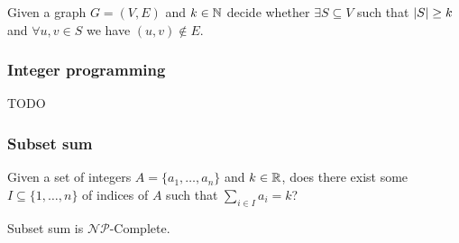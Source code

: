 \documentclass[12pt]{extarticle}
\newcommand{\NP}{{\mathcal{NP}}}
\newcommand{\NPC}{$\NP$-Complete}
\begin{document}
\begin{definition}
    Given a graph $G=(V,E)$ and $k \in \mathbb{N}$ decide whether $\exists S \subseteq V$ such that $\abs{S} \geq k$ and $\forall u, v \in S$ we have $(u, v) \notin E$.
\end{definition}

\subsubsection{Integer programming}
TODO

\subsubsection{Subset sum}
\label{sec:np:subset_sum}

\begin{definition}
    Given a set of integers $A = \{a_1, \ldots, a_n\}$ and $k \in \mathbb{R}$, does there exist some $I \subseteq \{1, \ldots, n\}$ of indices of $A$ such that $\sum_{i \in I} a_i = k$?
\end{definition}

\begin{theorem}
    Subset sum is \NPC.
\end{theorem}
\end{document}
